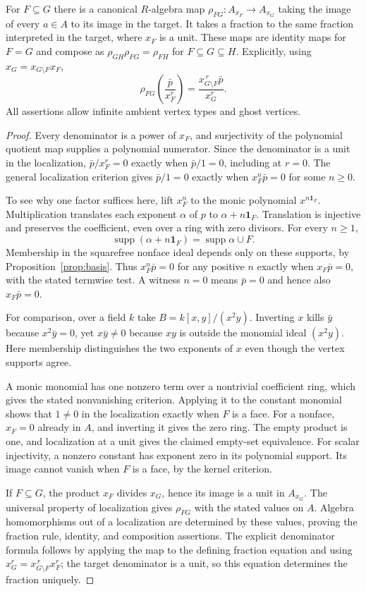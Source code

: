 \begin{lemma}
For $F\subseteq G$ there is a canonical $R$-algebra map
$\rho_{FG}:A_{x_F}\longrightarrow A_{x_G}$ taking the image of every
$a\in A$ to its image in the target. It takes a fraction to the same
fraction interpreted in the target, where $x_F$ is a unit. These maps are
identity maps for $F=G$ and compose as
$\rho_{GH}\rho_{FG}=\rho_{FH}$ for $F\subseteq G\subseteq H$.
Explicitly, using $x_G=x_{G\setminus F}x_F$,
\[
 \rho_{FG}\left(\frac{\bar p}{x_F^r}\right)
   =\frac{x_{G\setminus F}^{\,r}\bar p}{x_G^r}.
\]
All assertions allow infinite ambient vertex types and ghost vertices.
\end{lemma}
\begin{proof}
\leanok
Every denominator is a power of $x_F$, and surjectivity of the polynomial
quotient map supplies a polynomial numerator. Since the denominator is a
unit in the localization, $\bar p/x_F^r=0$ exactly when $\bar p/1=0$,
including at $r=0$. The general localization criterion gives
$\bar p/1=0$ exactly when $x_F^n\bar p=0$ for some $n\geq0$.

To see why one factor suffices here, lift $x_F^n$ to the monic polynomial
$x^{n\mathbf1_F}$. Multiplication translates each exponent $\alpha$ of $p$
to $\alpha+n\mathbf1_F$. Translation is injective and preserves the
coefficient, even over a ring with zero divisors. For every $n\geq1$,
\[
  \operatorname{supp}(\alpha+n\mathbf1_F)
     =\operatorname{supp}\alpha\cup F .
\]
Membership in the squarefree nonface ideal depends only on these supports,
by Proposition~\ref{prop:basis}. Thus $x_F^n\bar p=0$ for any positive
$n$ exactly when $x_F\bar p=0$, with the stated termwise test.
A witness $n=0$ means $\bar p=0$ and hence also $x_F\bar p=0$.

For comparison, over a field $k$ take $B=k[x,y]/(x^2y)$. Inverting $x$
kills $\bar y$ because $x^2\bar y=0$, yet $x\bar y\ne0$ because $xy$ is
outside the monomial ideal $(x^2y)$. Here membership distinguishes the
two exponents of $x$ even though the vertex supports agree.

A monic monomial has one nonzero term over a nontrivial coefficient ring,
which gives the stated nonvanishing criterion. Applying it to the constant
monomial shows that $1\ne0$ in the localization exactly when $F$ is a face.
For a nonface, $x_F=0$ already in $A$, and inverting it gives the zero ring.
The empty product is one, and localization at a unit gives the claimed
empty-set equivalence.
For scalar injectivity, a nonzero constant has exponent zero in its
polynomial support. Its image cannot vanish when $F$ is a face, by the
kernel criterion.

If $F\subseteq G$, the product $x_F$ divides $x_G$, hence its image is a
unit in $A_{x_G}$. The universal property of localization gives
$\rho_{FG}$ with the stated values on $A$. Algebra homomorphisms out of
a localization are determined by these values, proving the fraction rule,
identity, and composition assertions. The explicit denominator formula
follows by applying the map to the defining fraction equation and using
$x_G^r=x_{G\setminus F}^{\,r}x_F^r$; the target denominator is a unit, so
this equation determines the fraction uniquely.
\end{proof}

